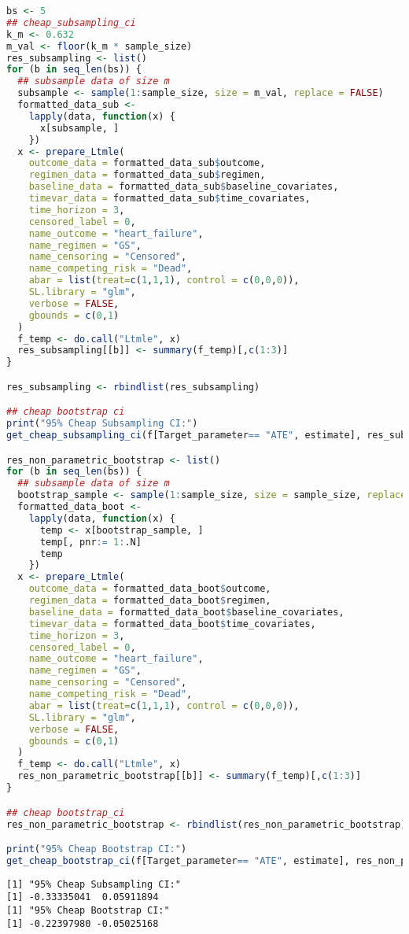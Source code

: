 \documentclass[11pt]{article}
\begin{document}
\begin{lstlisting}[language=r,numbers=none]
bs <- 5
## cheap_subsampling_ci
k_m <- 0.632
m_val <- floor(k_m * sample_size)
res_subsampling <- list()
for (b in seq_len(bs)) {
  ## subsample data of size m
  subsample <- sample(1:sample_size, size = m_val, replace = FALSE)
  formatted_data_sub <-
    lapply(data, function(x) {
      x[subsample, ]
    })
  x <- prepare_Ltmle(
    outcome_data = formatted_data_sub$outcome,
    regimen_data = formatted_data_sub$regimen,
    baseline_data = formatted_data_sub$baseline_covariates,
    timevar_data = formatted_data_sub$time_covariates,
    time_horizon = 3,
    censored_label = 0,
    name_outcome = "heart_failure",
    name_regimen = "GS",
    name_censoring = "Censored",
    name_competing_risk = "Dead",
    abar = list(treat=c(1,1,1), control = c(0,0,0)),
    SL.library = "glm",
    verbose = FALSE,
    gbounds = c(0,1)
  )
  f_temp <- do.call("Ltmle", x)
  res_subsampling[[b]] <- summary(f_temp)[,c(1:3)]
}

res_subsampling <- rbindlist(res_subsampling)

## cheap bootstrap ci
print("95% Cheap Subsampling CI:")
get_cheap_subsampling_ci(f[Target_parameter== "ATE", estimate], res_subsampling[Target_parameter == "ATE", estimate], m_val, sample_size, 0.05)

res_non_parametric_bootstrap <- list()
for (b in seq_len(bs)) {
  ## subsample data of size m
  bootstrap_sample <- sample(1:sample_size, size = sample_size, replace = TRUE)
  formatted_data_boot <-
    lapply(data, function(x) {
      temp <- x[bootstrap_sample, ]
      temp[, pnr:= 1:.N]
      temp
    })
  x <- prepare_Ltmle(
    outcome_data = formatted_data_boot$outcome,
    regimen_data = formatted_data_boot$regimen,
    baseline_data = formatted_data_boot$baseline_covariates,
    timevar_data = formatted_data_boot$time_covariates,
    time_horizon = 3,
    censored_label = 0,
    name_outcome = "heart_failure",
    name_regimen = "GS",
    name_censoring = "Censored",
    name_competing_risk = "Dead",
    abar = list(treat=c(1,1,1), control = c(0,0,0)),
    SL.library = "glm",
    verbose = FALSE,
    gbounds = c(0,1)
  )
  f_temp <- do.call("Ltmle", x)
  res_non_parametric_bootstrap[[b]] <- summary(f_temp)[,c(1:3)]
}

## cheap bootstrap_ci
res_non_parametric_bootstrap <- rbindlist(res_non_parametric_bootstrap)

print("95% Cheap Bootstrap CI:")
get_cheap_bootstrap_ci(f[Target_parameter== "ATE", estimate], res_non_parametric_bootstrap[Target_parameter == "ATE", estimate], nrow(outcome$data), 0.05)
\end{lstlisting}

\begin{verbatim}
[1] "95% Cheap Subsampling CI:"
[1] -0.33335041  0.05911894
[1] "95% Cheap Bootstrap CI:"
[1] -0.22397980 -0.05025168
\end{verbatim}




\end{document}
